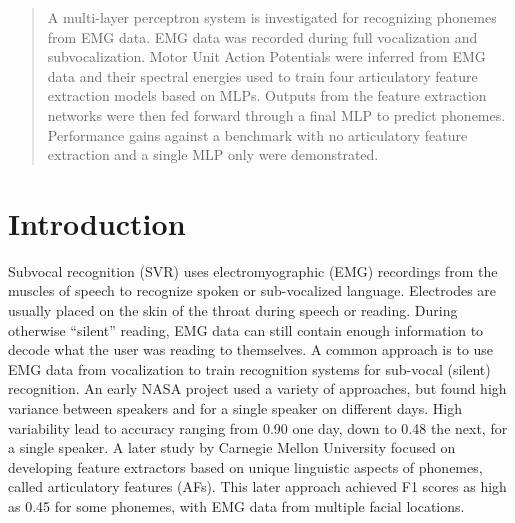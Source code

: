 \documentclass[conference]{IEEEtran}
\begin{document}
\begin{abstract}
A multi-layer perceptron system is investigated for recognizing phonemes from EMG data. EMG data was recorded during full vocalization and subvocalization. Motor Unit Action Potentials were inferred from EMG data and their spectral energies used to train four articulatory feature extraction models based on MLPs. Outputs from the feature extraction networks were then fed forward through a final MLP to predict phonemes. Performance gains against a benchmark with no articulatory feature extraction and a single MLP only were demonstrated.
\end{abstract}





%
\IEEEpeerreviewmaketitle



\section{Introduction}
Subvocal recognition (SVR) uses electromyographic (EMG) recordings from the muscles of speech to recognize spoken or sub-vocalized language. Electrodes are usually placed on the skin of the throat during speech or reading. During otherwise “silent” reading, EMG data can still contain enough information to decode what the user was reading to themselves. A common approach is to use EMG data from vocalization to train recognition systems for sub-vocal (silent) recognition. An early NASA project used a variety of approaches, but found high variance between speakers and for a single speaker on different days. High variability lead to accuracy ranging from 0.90 one day, down to 0.48 the next, for a single speaker. \cite{NASA} A later study by Carnegie Mellon University focused on developing feature extractors based on unique linguistic aspects of phonemes, called articulatory features (AFs). \cite{EARS} This later approach achieved F1 scores as high as 0.45 for some phonemes, with EMG data from multiple facial locations.
\end{document}
